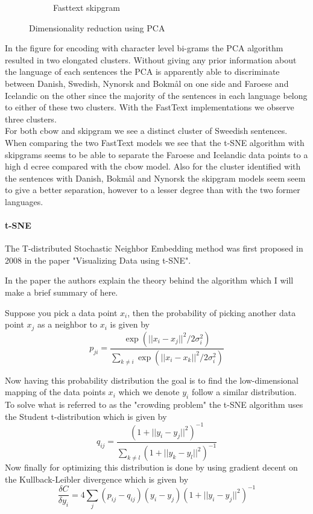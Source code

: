 \begin{figure}[h!]
\begin{subfigure}[b]{0.47\textwidth}
        \caption{Fasttext skipgram}
    \end{subfigure}
    \caption{Dimensionality reduction using PCA}
    \label{pca}
\end{figure}

In the figure for encoding with character level bi-grams the PCA algorithm resulted in two elongated clusters. Without giving any prior information about the language of each sentences the PCA is apparently able to discriminate between Danish, Swedish, Nynorsk and Bokmål on one side and Faroese and Icelandic on the other since the majority of the sentences in each language belong to either of these two clusters. With the FastText implementations we observe three clusters.\\

For both cbow and skipgram we see a distinct cluster of Sweedish sentences. When comparing the two FastText models we see that the t-SNE algorithm with skipgrams seems to be able to separate the Faroese and Icelandic data points to a high d ecree compared with the cbow model. Also for the cluster identified with the sentences with Danish, Bokmål and Nynorsk the skipgram models seem seem to give a better separation, however to a lesser degree than with the two former languages.

\paragraph{t-SNE}

The T-distributed Stochastic Neighbor Embedding method was first proposed in 2008 in the paper "Visualizing Data using t-SNE"\cite{tsne}.

In the paper the authors explain the theory behind the algorithm which I  will make a brief summary of here.

Suppose you pick a data point $x_i$, then the probability of picking another data point $x_j$ as a neighbor to $x_i$ is given by
\begin{equation}
p_{ji}= \frac{\exp (|| x_i - x_j ||^2/2\sigma_i^2 )}{\sum_{k\neq i} \exp (|| x_i - x_k ||^2/2\sigma_i^2 )}
\end{equation}

Now having this probability distribution the goal is to find the low-dimensional mapping of the data points $x_i$ which we denote $y_i$ follow a similar distribution. To solve what is referred to as the "crowding problem" the t-SNE algorithm uses the Student t-distribution which is given by
\begin{equation}
q_{ij}= \frac{ (1+|| y_i - y_j ||^2 )^{-1}}{\sum_{k\neq l} (1+|| y_k - y_l ||^2 )^{-1}}
\end{equation}
Now finally for optimizing this distribution is done by using gradient decent on the Kullback-Leibler divergence which is given by
\begin{equation}
\frac{\delta C}{\delta y_i}= 4 \sum_j (p_{ij} - q_{ij})(y_i-y_j)(1+ || y_i - y_j ||^2  )^{-1}
\end{equation}

